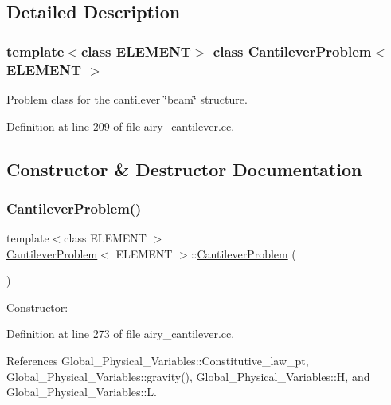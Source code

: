 \subsection{Detailed Description}
\subsubsection*{template$<$class E\+L\+E\+M\+E\+NT$>$\newline
class Cantilever\+Problem$<$ E\+L\+E\+M\+E\+N\+T $>$}

Problem class for the cantilever \char`\"{}beam\char`\"{} structure. 

Definition at line 209 of file airy\+\_\+cantilever.\+cc.



\subsection{Constructor \& Destructor Documentation}
\mbox{\label{classCantileverProblem_abba97fc4b8402bc0363fdf16322f6572}} 
\subsubsection{\texorpdfstring{Cantilever\+Problem()}{CantileverProblem()}\hspace{0.1cm}{\footnotesize\ttfamily [1/2]}}
{\footnotesize\ttfamily template$<$class E\+L\+E\+M\+E\+NT $>$ \\
\hyperlink{classCantileverProblem}{Cantilever\+Problem}$<$ E\+L\+E\+M\+E\+NT $>$\+::\hyperlink{classCantileverProblem}{Cantilever\+Problem} (\begin{DoxyParamCaption}{ }\end{DoxyParamCaption})}



Constructor\+: 



Definition at line 273 of file airy\+\_\+cantilever.\+cc.



References Global\+\_\+\+Physical\+\_\+\+Variables\+::\+Constitutive\+\_\+law\+\_\+pt, Global\+\_\+\+Physical\+\_\+\+Variables\+::gravity(), Global\+\_\+\+Physical\+\_\+\+Variables\+::H, and Global\+\_\+\+Physical\+\_\+\+Variables\+::L.

